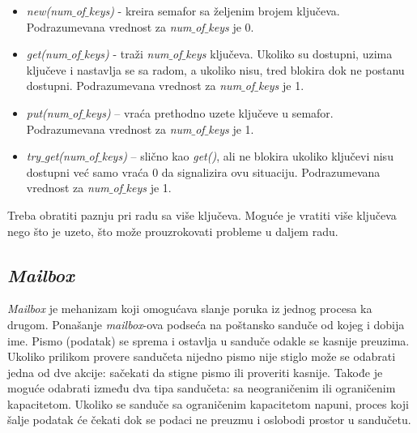 \begin{itemize}
\item \emph{new(num\(\_\)of\(\_\)keys)} - kreira semafor sa željenim brojem
  ključeva. Podrazumevana vrednost za \emph{num\(\_\)of\(\_\)keys} je 0.
\item \emph{get(num\(\_\)of\(\_\)keys)} - traži \emph{num\(\_\)of\(\_\)keys}
  ključeva. Ukoliko su dostupni, uzima ključeve i nastavlja se sa radom, a
  ukoliko nisu, tred blokira dok ne postanu dostupni. Podrazumevana vrednost za
  \emph{num\(\_\)of\(\_\)keys} je 1.
\item \emph{put(num\(\_\)of\(\_\)keys)} – vraća prethodno uzete ključeve u
  semafor. Podrazumevana vrednost za \emph{num\(\_\)of\(\_\)keys} je 1.
\item \emph{try\(\_\)get(num\(\_\)of\(\_\)keys)} – slično kao \emph{get()}, ali
  ne blokira ukoliko ključevi nisu dostupni već samo vraća 0 da signalizira ovu
  situaciju. Podrazumevana vrednost za \emph{num\(\_\)of\(\_\)keys} je 1.
\end{itemize}

Treba obratiti paznju pri radu sa više ključeva. Moguće je vratiti više ključeva
nego što je uzeto, što može prouzrokovati probleme u daljem radu.




\subsection{\emph{Mailbox}}

\emph{Mailbox} je mehanizam koji omogućava slanje poruka iz jednog procesa ka
drugom.
Ponašanje \emph{mailbox}-ova podseća na poštansko sanduče od kojeg i dobija ime.
Pismo (podatak) se sprema i ostavlja u sanduče odakle se kasnije preuzima.
Ukoliko prilikom provere sandučeta nijedno pismo nije stiglo može se odabrati
jedna od dve akcije: sačekati da stigne pismo ili proveriti kasnije.
Takođe je moguće odabrati između dva tipa sandučeta: sa neograničenim ili
ograničenim kapacitetom.
Ukoliko se sanduče sa ograničenim kapacitetom napuni, proces koji šalje podatak
će čekati dok se podaci ne preuzmu i oslobodi prostor u sandučetu.\\

